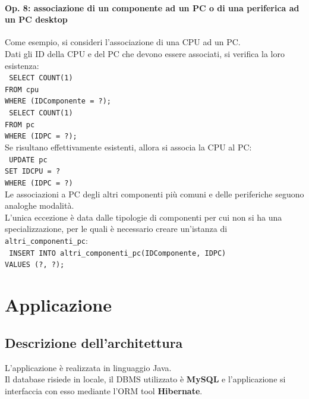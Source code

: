 \documentclass[a4paper,12pt]{report}
\begin{document}
\subsubsection{Op. 8: associazione di un componente ad un PC o di una periferica ad un PC desktop}

Come esempio, si consideri l'associazione di una CPU ad un PC. \\
Dati gli ID della CPU e del PC che devono essere associati, si verifica la loro esistenza: \\

\noindent \texttt{
SELECT COUNT(1) \\
FROM cpu \\
WHERE (IDComponente = ?);
} \\

\noindent \texttt{
SELECT COUNT(1) \\
FROM pc \\
WHERE (IDPC = ?);
} \\

\noindent Se risultano effettivamente esistenti, allora si associa la CPU al PC: \\
\texttt{
UPDATE pc \\
SET IDCPU = ? \\
WHERE (IDPC = ?)
} \\

\noindent Le associazioni a PC degli altri componenti più comuni e delle periferiche seguono analoghe modalità. \\
L'unica eccezione è data dalle tipologie di componenti per cui non si ha una specializzazione, per le quali è necessario creare un'istanza di \texttt{altri\_componenti\_pc}: \\
\texttt{
INSERT INTO altri\_componenti\_pc(IDComponente, IDPC) \\
VALUES (?, ?);
}


\chapter{Applicazione}

\section{Descrizione dell'architettura}

L'applicazione è realizzata in linguaggio Java. \\
Il database risiede in locale, il DBMS utilizzato è \textbf{MySQL} e l'applicazione si interfaccia con esso mediante l'ORM tool \textbf{Hibernate}. \\
\end{document}
